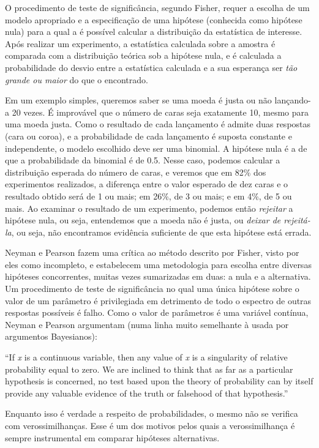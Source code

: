 O procedimento de teste de significância, segundo Fisher, requer a escolha de um modelo apropriado e a especificação de uma 
hipótese (conhecida como hipótese nula) para a qual a é possível calcular a distribuição da estatística de interesse. 
Após realizar um experimento, a estatística calculada sobre a amostra é comparada com a distribuição teórica sob a hipótese nula,
e é calculada a probabilidade do desvio entre a estatística calculada e a sua esperança ser {\em tão grande ou maior} do que o
encontrado. 

Em um exemplo simples, queremos saber se uma moeda é justa ou não lançando-a 20 vezes. É improvável que o número de caras seja
exatamente 10, mesmo para uma moeda justa. Como o resultado de cada lançamento é
admite duas	respostas (cara ou coroa), e a probabilidade de cada lançamento é suposta constante e independente, o modelo escolhido
deve ser uma binomial. A hipótese nula é a de que a probabilidade da binomial é de 0.5. Nesse caso, podemos calcular a 
distribuição esperada do número de caras, e veremos que em 82\% dos experimentos realizados, a diferença entre o valor esperado
de dez caras e o resultado obtido será de 1 ou mais; em 26\%, de 3 ou mais; e em 4\%, de 5 ou mais. Ao examinar o resultado 
de um experimento, podemos então {\em rejeitar} a hipótese nula, ou seja, entendemos que a moeda não é justa, ou {\em deixar
de rejeitá-la}, ou seja, não encontramos evidência suficiente de que esta hipótese está errada.

Neyman e Pearson fazem uma crítica ao método descrito por Fisher, visto por eles como incompleto, e estabelecem uma metodologia
para escolha entre diversas hipóteses concorrentes, muitas vezes sumarizadas em duas: a nula e a alternativa.
Um procedimento de teste de significância
no qual uma única hipótese sobre o valor de um parâmetro é privilegiada em detrimento de todo o espectro de outras respostas
possíveis é falho. Como o valor de parâmetros é uma variável contínua, Neyman e Pearson argumentam (numa linha muito semelhante
à usada por argumentos Bayesianos):

``If {\em x} is a continuous variable, then any value of {\em x} is a singularity of relative probability equal to zero. We are
inclined to think that as far as a particular hypothesis is concerned, no test based upon the theory of probability can by
itself provide any valuable evidence of the truth or falsehood of that hypothesis.'' \citep{Neyman1933}

Enquanto isso é verdade a respeito de probabilidades, o mesmo não se verifica com verossimilhanças. Esse é um dos motivos
pelos quais a verossimilhança é sempre instrumental em comparar hipóteses alternativas.

